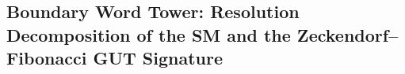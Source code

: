 \subsection{Boundary Word Tower: Resolution Decomposition of the SM and the Zeckendorf--Fibonacci GUT Signature}\label{subsec:bdry-tower-zeck-gut}












